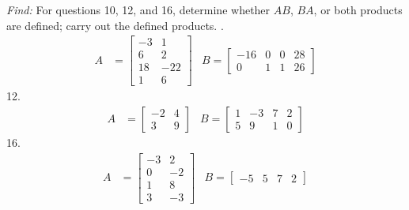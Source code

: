 \documentclass[11pt]{homework}
\begin{document}
\newpage
\emph{Find:}
\newline
For questions 10, 12, and 16, determine whether $AB$, $BA$,
or both products are defined; carry out the defined products.
. 
\begin{align*}
A&=
  \begin{bmatrix}
    -3 & 1 \\
    6 & 2 \\
    18 & -22 \\
    1 & 6
  \end{bmatrix}
&B=
  \begin{bmatrix}
    -16 & 0 & 0 & 28 \\
    0   & 1 & 1 & 26 
  \end{bmatrix}
\end{align*}
12. 
\begin{align*}
A&=
  \begin{bmatrix}
    -2 & 4 \\
    3 & 9 
  \end{bmatrix}
&B=
  \begin{bmatrix}
    1 & -3 & 7 & 2 \\
    5 & 9 & 1 & 0 
  \end{bmatrix}
\end{align*}  
16. 
\begin{align*}
A&=
  \begin{bmatrix}
    -3 & 2 \\
    0 & -2 \\
    1 & 8 \\
    3 & -3 
  \end{bmatrix}
&B=
  \begin{bmatrix}
    -5 & 5 & 7 & 2
  \end{bmatrix}
\end{align*}  
\end{document}
